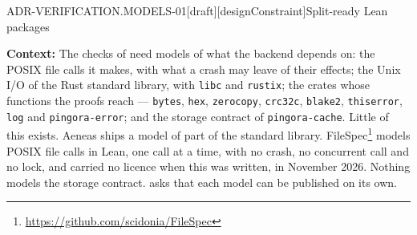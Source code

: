 
\begin{requirement}{ADR-VERIFICATION.MODELS-01}[draft][designConstraint]{Split-ready Lean packages}


  \textbf{Context:} The checks of  need
  models of what the backend depends on: the POSIX file calls it makes, with
  what a crash may leave of their effects; the Unix I/O of the Rust standard
  library, with \texttt{libc} and \texttt{rustix}; the crates whose functions
  the proofs reach --- \texttt{bytes}, \texttt{hex}, \texttt{zerocopy},
  \texttt{crc32c}, \texttt{blake2}, \texttt{thiserror}, \texttt{log} and
  \texttt{pingora-error}; and the storage contract of \texttt{pingora-cache}.
  Little of this exists. Aeneas ships a model of part of the standard
  library. FileSpec\footnote{\url{https://github.com/scidonia/FileSpec}}
  models POSIX file calls in Lean, one call at a time, with no crash, no
  concurrent call and no lock, and carried no licence when this was written,
  in November 2026. Nothing models the storage contract.
   asks that each model can be published
  on its own.


\end{requirement}
